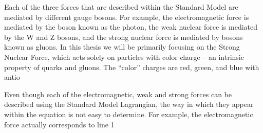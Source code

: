Each of the three forces that are described within the Standard Model are mediated by different gauge bosons. For example, the electromagnetic force is mediated by the boson known as the photon, the weak nuclear force is mediated by the W and Z bosons, and the strong nuclear force is mediated by bosons known as gluons. 
In this thesis we will be primarily focusing on the Strong Nuclear Force, which acts solely on particles with color charge -- an intrinsic property of quarks and gluons. 
The ``color'' charges are red, green, and blue with antio


Even though each of the electromagnetic, weak and strong forces can be described using the Standard Model Lagrangian, the way in which they appear within the equation is not easy to determine.
For example, the electromagnetic force actually corresponds to line 1
